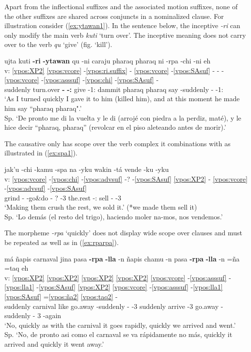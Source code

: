\documentclass[output=paper]{langscibook}
\begin{document}
Apart from the inflectional suffixes and the associated  motion suffixes, none of the other suffixes are shared across conjuncts in a nominalized clause. For illustration consider (\ref{ex:ytawan1}). In the sentence below, the inceptive \textit{-ri} can only modify the main verb \textit{kuti} `turn over'. The inceptive meaning does not carry over to the verb \textit{qu} `give' (fig. `kill').

\ea \label{ex:ytawan1}
    \glll{} ujta kuti \textbf{-ri} \textbf{-ytawan} qu -ni caraju pharaq pharaq ni -rpa -chi -ni eh \\ 
    v: \ref{vpos:XP2} \ref{vpos:vcore} -\ref{vpos:ri.suffix} - \ref{vpos:vcore} -\ref{vpos:SAsuf} - - - \ref{vpos:vcore} -\ref{vpos:asssuf} -\ref{vpos:chi} -\ref{vpos:SAsuf} - \\
    {} suddenly turn.over \textbf{-\Incept{}} \textbf{-\Nmlz{}:\Prior{}} give -1\Sg{}:\Pst{} dammit pharaq pharaq say -suddenly -\Caus{} -1\Sg{}:\Pst{}  \\
    \glt `As I turned quickly I gave it to him (killed him), and at this moment he made him say ``pharaq pharaq".' \\ Sp. `De pronto me di la vuelta y le di (arrojé con piedra a la perdiz, maté), y le hice decir “pharaq, pharaq” (revolcar en el piso aleteando antes de morir).'
\z

The causative only has scope over the verb complex it combinations with as illustrated in (\ref{ex:spa1}).

\ea \label{ex:spa1}
    \glll{} jak'u -chi -kamu -spa na -yku wakin -tá vende -ku -yku \\
    v: \ref{vpos:vcore} -\ref{vpos:chi} -\ref{vpos:advsuf} -? -\ref{vpos:SAsuf} \ref{vpos:XP2} - \ref{vpos:vcore} -\ref{vpos:advsuf} -\ref{vpos:SAsuf} \\
    {} grind -\Caus{} -go\&do -\Gerund{} ? -3\Pl{} the.rest -\Acc{}:\Top{} sell -\Refl{} -3\Pl{} \\
    \glt `Making them crush the rest, we sold it.' (*we made them sell it) \\ Sp. `Lo demás (el resto del trigo), haciendo moler na-mos, nos vendemos.'
\z 
    
The morpheme \textit{-rpa} `quickly' does not display wide scope over clauses and must be repeated as well as in (\ref{ex:rparpa}).

\ea \label{ex:rparpa}
    \glll {} má ñapis carnaval jina pasa \textbf{-rpa} \textbf{-lla} -n ñapis chamu -n pasa \textbf{-rpa} \textbf{-lla }-n =ña =taq eh \\  
    v: \ref{vpos:XP2} \ref{vpos:XP2} \ref{vpos:XP2} \ref{vpos:XP2} \ref{vpos:vcore} -\ref{vpos:asssuf} -\ref{vpos:lla1} -\ref{vpos:SAsuf} \ref{vpos:XP2} \ref{vpos:vcore} -\ref{vpos:asssuf} -\ref{vpos:lla1} \ref{vpos:SAsuf} =\ref{vpos:ña2} \ref{vpos:taq2} - \\
    {} \Neg{} suddenly carnival like go.away -suddenly -\Limit{} -3\Sg{} suddenly arrive -3\Sg{} go.away -suddenly -\Limit{} 3\Sg{} -again \\
    \glt `No, quickly as with the carnival it goes rapidly, quickly we arrived and went.' \\ Sp. `No, de pronto asi como el carnaval se va rápidamente no más, quickly it arrived and quickly it went away.'
\z 
\end{document}
